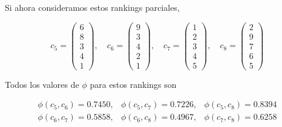 \begin{ejemplo}
Si ahora consideramos estos rankings parciales,

\begin{equation*}
c_5 = \left( \begin{array}{c}
6\\
8\\
3\\
4\\
1
\end{array} \right), \quad
c_6 = \left( \begin{array}{c}
9\\
3\\
4\\
2\\
1
\end{array} \right), \quad
c_7 = \left( \begin{array}{c}
1\\
2\\
3\\
4\\
5
\end{array} \right), \quad
c_8 = \left( \begin{array}{c}
2\\
9\\
7\\
6\\
5
\end{array} \right)
\end{equation*}

Todos los valores de $\phi$ para estos rankings son

\begin{equation*}
\begin{array}{ccc}
\phi(c_5, c_6) = 0.7450, & \phi(c_5, c_7) = 0.7226, & \phi(c_5, c_8) = 0.8394\\
\phi(c_6, c_7) = 0.5858, & \phi(c_6, c_8) = 0.4967, & \phi(c_7, c_8) = 0.6258 
\end{array}
\end{equation*}
\end{ejemplo}